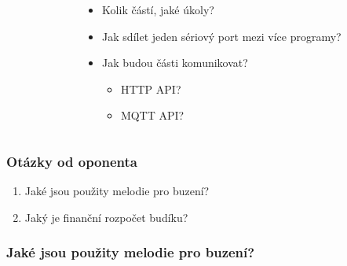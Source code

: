 \documentclass[
    utf8,
    aspectratio=169,
    17pt,  %
]{beamer}
\newcommand{\fullsizegraphics}[2][]{%
    \centering%
    \texttt{[image: \#2]}%
}
\begin{document}
\begin{frame}
\begin{columns}
\begin{column}{0.5\textwidth}
        \end{column}
        \begin{column}{0.5\textwidth}
            \begin{itemize}
                \item Kolik částí, jaké úkoly?
                \item Jak sdílet jeden sériový port mezi více programy?
                \item Jak budou části komunikovat?
                    \begin{itemize}
                        \item HTTP API?
                        \item MQTT API?
                    \end{itemize}
            \end{itemize}
        \end{column}
    \end{columns}
\end{frame}


\begin{frame}
    \frametitle{Otázky od oponenta}
    \begin{enumerate}
        \item Jaké jsou použity melodie pro buzení?
        \item Jaký je finanční rozpočet budíku?
    \end{enumerate}
\end{frame}

\begin{frame}
    \frametitle{Jaké jsou použity melodie pro buzení?}
    \only<2>{
        \fullsizegraphics{zvuk-sine-1k-ramp-silence}
    }
\end{frame}
\end{document}
